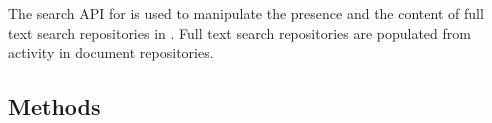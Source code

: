 The search API for \Rapture is used to manipulate the presence and the content of
full text search repositories in \Rapture. Full text search repositories are populated
from activity in document repositories.

\subsection{Methods}
